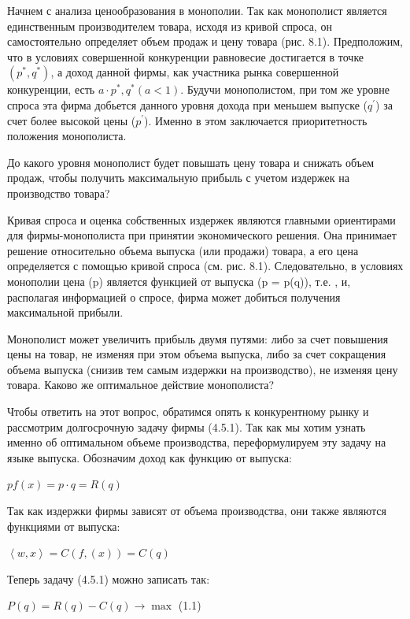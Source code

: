 \documentclass[12pt, 4paper]{book}
\begin{document}
{Начнем с анализа ценообразования в монополии. Так как монополист является единственным производителем товара, исходя из кривой спроса, он самостоятельно определяет объем продаж и цену товара (рис. 8.1). Предположим, что в условиях совершенной конкуренции равновесие достигается в точке $(p^{*},q^{*})$, а доход данной фирмы, как участника рынка совершенной конкуренции, есть $a \cdot p^{*},q^{*} (a <1)$. Будучи монополистом, при том же уровне спроса эта фирма добьется данного уровня дохода при меньшем выпуске ($q^{'}$) за счет более высокой цены ($p^{'}$). Именно в этом заключается приоритетность положения монополиста.
\par

До какого уровня монополист будет повышать цену товара и снижать объем продаж, чтобы получить максимальную прибыль с учетом издержек на производство товара?
\par

Кривая спроса и оценка собственных издержек являются главными ориентирами для фирмы-монополиста при принятии экономического решения. Она принимает решение относительно объема выпуска (или продажи) товара, а его цена определяется с помощью кривой спроса (см. рис. 8.1). Следовательно, в условиях монополии цена (p) является функцией от выпуска (p = p(q)), т.е. , и, располагая информацией о спросе, фирма может добиться получения максимальной прибыли.
\par

Монополист может увеличить прибыль двумя путями: либо за счет повышения цены на товар, не изменяя при этом объема выпуска, либо за счет сокращения объема выпуска (снизив тем самым издержки на производство), не изменяя цену товара. Каково же оптимальное действие монополиста?
\par

Чтобы ответить на этот вопрос, обратимся опять к конкурентному рынку и рассмотрим долгосрочную задачу фирмы (4.5.1). Так как мы хотим узнать именно об оптимальном объеме производства, переформулируем эту задачу на языке выпуска. Обозначим доход как функцию от выпуска:
\begin{center}
$pf(x)=p \cdot q = R(q)$
\end{center}
\par

Так как издержки фирмы зависят от объема производства, они также являются функциями от выпуска:
\begin{center}
$\left\langle w,x\right\rangle = C(f,(x))=C(q)$
\end{center}
Теперь задачу (4.5.1) можно записать так:
\begin{center}
$P(q)=R(q)-C(q) \rightarrow \max$ (1.1)
\end{center}
\par

}
\end{document}
